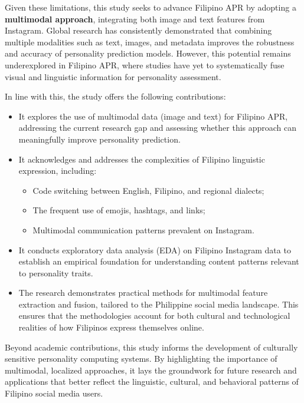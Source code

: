 Given these limitations, this study seeks to advance Filipino APR by adopting a \textbf{multimodal approach}, integrating both image and text features from Instagram. Global research has consistently demonstrated that combining multiple modalities such as text, images, and metadata improves the robustness and accuracy of personality prediction models. However, this potential remains underexplored in Filipino APR, where studies have yet to systematically fuse visual and linguistic information for personality assessment.

In line with this, the study offers the following contributions:

\begin{itemize}
	\item It explores the use of multimodal data (image and text) for Filipino APR, addressing the current research gap and assessing whether this approach can meaningfully improve personality prediction.
	
	\item It acknowledges and addresses the complexities of Filipino linguistic expression, including:
	\begin{itemize}
		\item Code switching between English, Filipino, and regional dialects;
		\item The frequent use of emojis, hashtags, and links;
		\item Multimodal communication patterns prevalent on Instagram.
	\end{itemize}
	
	\item It conducts exploratory data analysis (EDA) on Filipino Instagram data to establish an empirical foundation for understanding content patterns relevant to personality traits.
	
	\item The research demonstrates practical methods for multimodal feature extraction and fusion, tailored to the Philippine social media landscape. This ensures that the methodologies account for both cultural and technological realities of how Filipinos express themselves online.
\end{itemize}

Beyond academic contributions, this study informs the development of culturally sensitive personality computing systems. By highlighting the importance of multimodal, localized approaches, it lays the groundwork for future research and applications that better reflect the linguistic, cultural, and behavioral patterns of Filipino social media users.

